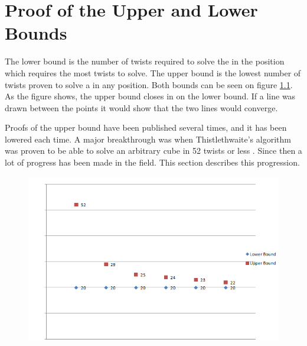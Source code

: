 \chapter{Proof of the Upper and Lower Bounds}

The lower bound is the number of twists required to solve the \rubik{} in the position which requires the most twists to solve.
The upper bound is the lowest number of twists proven to solve a \rubik{} in any position.
Both bounds can be seen on figure \ref{fig:upperLowerBound}.
As the figure shows, the upper bound closes in on the lower bound.
If a line was drawn between the points it would show that the two lines would converge.

Proofs of the upper bound have been published several times, and it has been lowered each time.
A major breakthrough was when Thistlethwaite's algorithm was proven to be able to solve an arbitrary cube in 52 twists or less \cite{jaapthistle}.
Since then a lot of progress has been made in the field.
This section describes this progression.

\begin{figure}[ht]
	\centering
		\includegraphics[scale = 0.7]{input/pics/bounds.png}
	\caption{}
	\label{fig:upperLowerBound}
\end{figure}





